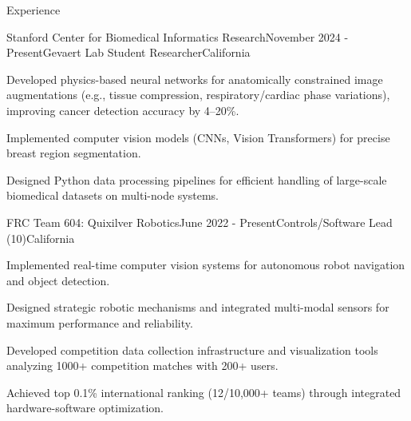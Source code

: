 \documentclass[
  10pt, %
]{resume}
\begin{document}
\sloppy


\begin{rSection}{Experience}


  \begin{rSubsection}{Stanford Center for Biomedical Informatics Research}{November 2024 - Present}{Gevaert Lab Student Researcher}{California}
    
    \item Developed physics-based neural networks for anatomically constrained image augmentations (e.g., tissue compression, respiratory/cardiac phase variations), improving cancer detection accuracy by 4–20\%.
    
    \item Implemented computer vision models (CNNs, Vision Transformers) for precise breast region segmentation.
    
    \item Designed Python data processing pipelines for efficient handling of large-scale biomedical datasets on multi-node systems.
    
  \end{rSubsection}
        
  \begin{rSubsection}{FRC Team 604: Quixilver Robotics}{June 2022 - Present}{Controls/Software Lead (10)}{California}
    
    \item Implemented real-time computer vision systems for autonomous robot navigation and object detection.
    
    \item Designed strategic robotic mechanisms and integrated multi-modal sensors for maximum performance and reliability.
    
    \item Developed competition data collection infrastructure and visualization tools analyzing 1000+ competition matches with 200+ users.
    
    \item Achieved top 0.1\% international ranking (12/10,000+ teams) through integrated hardware-software optimization.
    
  \end{rSubsection}
        

\end{rSection}
\end{document}
